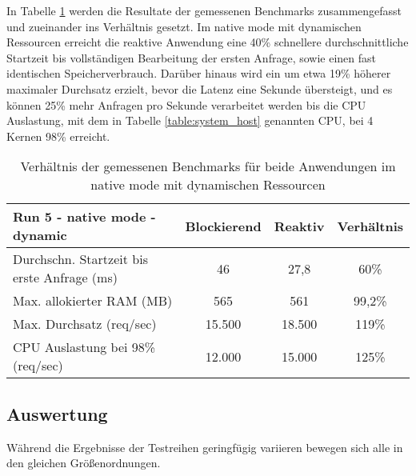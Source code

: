 In Tabelle \ref{table:dynamic_native_measurement_results} werden die Resultate der gemessenen Benchmarks zusammengefasst
und zueinander ins Verhältnis gesetzt. Im native mode mit dynamischen Ressourcen erreicht die reaktive Anwendung
eine 40\% schnellere durchschnittliche Startzeit bis vollständigen Bearbeitung der ersten Anfrage, sowie einen fast identischen
Speicherverbrauch.
Darüber hinaus wird ein um etwa 19\% höherer maximaler Durchsatz erzielt, bevor die Latenz eine Sekunde übersteigt, und
es können 25\% mehr Anfragen pro Sekunde verarbeitet werden bis die CPU Auslastung, mit dem in Tabelle \ref{table:system_host}
genannten CPU, bei 4 Kernen 98\% erreicht.

\begin{table}[ht!]
    \begin{tabular}{|l | c | c | c|}
        \hline
        Run 5 - native mode - dynamic & Blockierend & Reaktiv & Verhältnis \\
        \hline
        \makecell[l]{Durchschn. Startzeit bis                              \\erste Anfrage (ms)} &   46    &  27,8 &   60\%   \\
        \hline
        Max. allokierter RAM (MB)     & 565         & 561     & 99,2\%     \\
        \hline
        Max. Durchsatz (req/sec)      & 15.500      & 18.500  & 119\%      \\
        \hline
        \makecell[l]{CPU Auslastung bei 98\%                               \\(req/sec)} & 12.000 & 15.000 & 125\%  \\
        \hline
    \end{tabular}
    \caption{Verhältnis der gemessenen Benchmarks für beide Anwendungen im native mode mit dynamischen Ressourcen}
    \label{table:dynamic_native_measurement_results}
\end{table}

\subsection{Auswertung}
\label{subsubsec:auswertung}
Während die Ergebnisse der Testreihen geringfügig variieren bewegen sich alle in den gleichen Größenordnungen.

